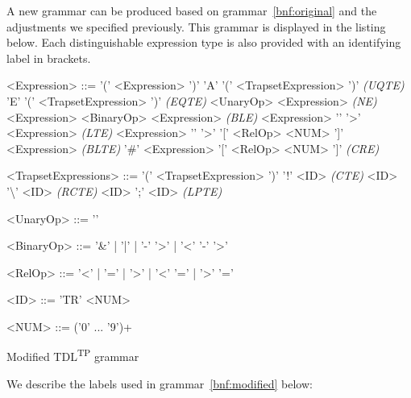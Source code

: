 \documentclass[12pt,oneside,a4paper,notitlepage]{report}
\newcommand{\texttilde}{\raisebox{0.5ex}{\texttildelow}}
\begin{document}
	\newpage

	\par A new grammar can be produced based on grammar~\ref{bnf:original} and the adjustments we specified previously. This grammar is displayed in the listing below. Each distinguishable expression type is also provided with an identifying label in brackets.
		
	\begin{GrammarWrapper}
		\begin{grammar}
			<Expression>	::=	'(' <Expression> ')'
			\alt 				'A' '(' <TrapsetExpression> ')' \textit{(UQTE)}
			\alt 				'E' '(' <TrapsetExpression> ')' \textit{(EQTE)}
			\alt 				<UnaryOp> <Expression> \textit{(NE)}
			\alt 				<Expression> <BinaryOp> <Expression> \textit{(BLE)}
			\alt 				<Expression> '\texttilde' '\textgreater' <Expression> \textit{(LTE)}
			\alt 				<Expression> '\texttilde' '\textgreater' '[' <RelOp> <NUM> ']' <Expression> \textit{(BLTE)}
			\alt 				'\#' <Expression> '[' <RelOp> <NUM> ']' \textit{(CRE)}
	
			<TrapsetExpressions>	::=	'(' <TrapsetExpression> ')'
			\alt						'!' <ID> \textit{(CTE)}
			\alt 						<ID> '\textbackslash' <ID> \textit{(RCTE)}
			\alt						<ID> ';' <ID> \textit{(LPTE)}
	
			<UnaryOp>	::= '\texttilde'
	
			<BinaryOp>	::= '\&' | '|' | '-' '\textgreater' | '\textless' '-' '\textgreater'
	
			<RelOp> 	::= '\textless' | '=' | '\textgreater' | '\textless' '=' | '\textgreater' '='
	
			<ID> 		::= 'TR' <NUM>
	
			<NUM> 		::= ('0' ... '9')+
		\end{grammar}
		\caption{Modified TDL\textsuperscript{TP} grammar}\label{bnf:modified}
	\end{GrammarWrapper}

	\newpage

	\par We describe the labels used in grammar~\ref{bnf:modified} below: %
\end{document}
